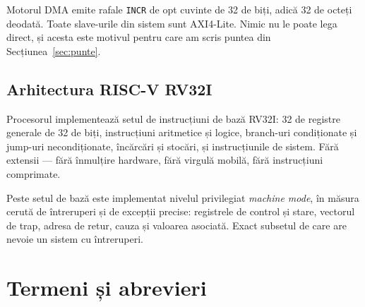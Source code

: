 \documentclass[11pt,openany]{report}
\newcommand{\sig}[1]{\texttt{#1}}
\begin{document}
Motorul DMA emite rafale \sig{INCR} de opt cuvinte de 32 de biți, adică 32 de
octeți deodată. Toate slave-urile din sistem sunt AXI4-Lite. Nimic nu le poate
lega direct, și acesta este motivul pentru care am scris puntea din
Secțiunea~\ref{sec:punte}.

\section{Arhitectura RISC-V RV32I}

Procesorul implementează setul de instrucțiuni de bază RV32I: 32 de registre
generale de 32 de biți, instrucțiuni aritmetice și logice, branch-uri condiționate
și jump-uri necondiționate, încărcări și stocări, și instrucțiunile de sistem. Fără
extensii --- fără înmulțire hardware, fără virgulă mobilă, fără instrucțiuni
comprimate.

Peste setul de bază este implementat nivelul privilegiat \emph{machine mode}, în
măsura cerută de întreruperi și de excepții precise: registrele de control și
stare, vectorul de trap, adresa de retur, cauza și valoarea asociată. Exact
subsetul de care are nevoie un sistem cu întreruperi.

\chapter{Termeni și abrevieri}
\label{app:acronime}
\end{document}

